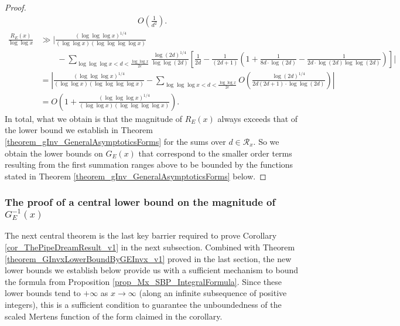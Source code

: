 \documentclass[11pt,reqno,a4letter]{article}
\numberwithin{figure}{section}
\numberwithin{table}{section}
\theoremstyle{plain}
\numberwithin{theorem}{section}
\theoremstyle{definition}
\begin{document}
\begin{proof}
{\begin{align*}
          O\left(\frac{1}{d^2}\right). 
     \end{align*} 
}
\begin{align*} 
\frac{R_E(x)}{\log\log x} & \gg \Biggl\lvert \frac{(\log\log\log x)^{1/4}}{(\log\log x) (\log\log\log\log x)} \\ 
     & \phantom{\gg \Biggl\lvert\ } - 
     \sum_{\log\log\log x < d < \frac{\log\log x}{2e}} 
     \frac{\log(2d)^{1/4}}{\log\log(2d)} \left[ 
     \frac{1}{2d} - \frac{1}{(2d+1)} \left(1 + \frac{1}{8d \cdot \log(2d)} - 
     \frac{1}{2d \cdot \log(2d) \log\log(2d)}\right) 
     \right] \Biggr\rvert \\ 
     & = 
     \left\lvert \frac{(\log\log\log x)^{1/4}}{(\log\log x) (\log\log\log\log x)} - 
     \sum_{\log\log\log x < d < \frac{\log\log x}{2e}} 
     O\left(\frac{\log(2d)^{1/4}}{2d (2d+1) \cdot \log\log(2d)}\right) \right\rvert \\ 
     & = O\left(1 + \frac{(\log\log\log x)^{1/4}}{(\log\log x) (\log\log\log\log x)}\right). 
\end{align*} 
In total, what we obtain is that the magnitude of $R_E(x)$ always exceeds that of the lower 
bound we establish in Theorem \ref{theorem_gInv_GeneralAsymptoticsForms} for the 
sums over $d \in \mathcal{R}_x$. 
So we obtain the lower bounds on $G_E(x)$ that correspond to the 
smaller order terms resulting from the first summation ranges above to be bounded by the 
functions stated in Theorem \ref{theorem_gInv_GeneralAsymptoticsForms} below. 
\end{proof} 

\subsubsection{The proof of a central lower bound on the magnitude of $G_{E}^{-1}(x)$} 

The next central theorem is the last key barrier required to prove 
Corollary \ref{cor_ThePipeDreamResult_v1} 
in the next subsection. 
Combined with Theorem \ref{theorem_GInvxLowerBoundByGEInvx_v1} 
proved in the last section, the new lower bounds we establish below provide us 
with a sufficient mechanism to bound the formula from 
Proposition \ref{prop_Mx_SBP_IntegralFormula}. 
Since these lower bounds tend to $+\infty$ as $x \rightarrow \infty$ (along an 
infinite subsequence of positive integers), this is a sufficient condition to 
guarantee the unboundedness of the scaled Mertens function of the form 
claimed in the corollary. 
\end{document}

